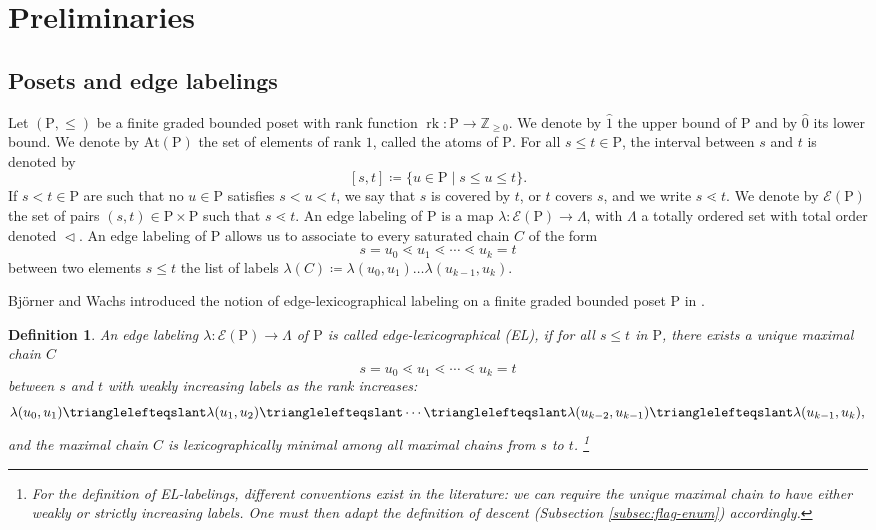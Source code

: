 \documentclass[11pt,a4paper]{amsart}
\theoremstyle{results}
\theoremstyle{definitions}
\newtheorem{definition}[thm]{Definition}
\def\P{\mathbb{P}}
\newcommand{\rk}{\operatorname{rk}}
\newcommand{\zero}{\hat{0}}
\newcommand{\un}{\hat{1}}
\newcommand{\At}{\mathrm{At}}
\newcommand{\Edge}{\mathcal{E}}
\renewcommand{\P}{\mathrm{P}}
\renewcommand{\hat}{\widehat}
\begin{document}
\section{Preliminaries}
\label{sec:definitions}
\subsection{Posets and edge labelings}
Let $(\P, \leqslant)$ be a finite graded bounded poset with rank function $\rk \colon \P \to \mathbb{Z}_{\geqslant 0}$. We denote by $\un$ the upper bound of $\P$ and by $\zero$ its lower bound. We denote by $\At(\P)$ the set of elements of rank $1$, called the atoms of $\P$. For all $s\leqslant t \in \P$, the interval between $s$ and $t$ is denoted by 
\[
[s, t] \coloneqq \{ u \in \P \mid s \leqslant u \leqslant t\}. 
\]
If $s < t \in \P$ are such that no $u \in \P$ satisfies $s < u < t$, we say that $s$ is covered by $t$, or $t$ covers $s$, and we write $s \lessdot t$. We denote by $\Edge(\P)$ the set of pairs $(s, t) \in \P \times \P$ such that $s \lessdot t.$ An edge labeling of $\P$ is a map $\lambda: \Edge(\P) \rightarrow \Lambda$, with $\Lambda$ a totally ordered set with total order denoted $\vartriangleleft$. An edge labeling of $\P$ allows us to associate to every saturated chain $C$ of the form 
\[
s = u_0 \lessdot u_1 \lessdot \cdots \lessdot u_k = t 
\] between two elements $s \leqslant t$ the list of labels $\lambda(C) \coloneqq \lambda(u_0, u_1)\ldots \lambda(u_{k-1}, u_k).$

Bj\"{o}rner and Wachs introduced the notion of edge-lexicographical labeling on a finite graded bounded poset $\P$ in \cite{bjorner-el-shellable, bjorner1983lexicographically}. 
\begin{definition}
An edge labeling $\lambda: \Edge(\P) \rightarrow \Lambda$ of $\P$ is called \textit{edge-lexicographical} (EL), if for all $s \leqslant t$ in $\P$, there exists a unique maximal chain $C$
\[
s = u_0 \lessdot u_1 \lessdot \cdots \lessdot u_{k} = t
\]
between $s$ and $t$ with weakly increasing labels as the rank increases: 
\[
\lambda(u_0, u_1) \trianglelefteqslant \lambda(u_1, u_2) \trianglelefteqslant \cdots \trianglelefteqslant \lambda(u_{k-2}, u_{k-1}) \trianglelefteqslant \lambda(u_{k-1}, u_k),
\] and the maximal chain $C$ is lexicographically minimal among all maximal chains from $s$ to $t$. \footnote{For the definition of EL-labelings, different conventions exist in the literature: we can require the unique maximal chain to have either weakly or strictly increasing labels. One must then adapt the definition of descent (Subsection \ref{subsec:flag-enum}) accordingly.  
}
\end{definition}
\end{document}
